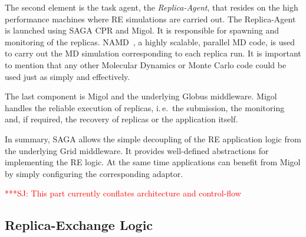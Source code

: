 \documentclass{rspublic}
\newcommand{\alnote}[1]{ {\textcolor{blue} { ***AL: #1 }}}
\newcommand{\jhanote}[1]{ {\textcolor{red} { ***SJ: #1 }}}
\newcommand{\alnote}[1]{}
\newcommand{\jhanote}[1]{}
\newcommand{\replicaagent}[1]{Replica-Agent }
\newcommand{\remanager}[1]{RE-Manager }
\begin{document}
The second element is the task agent, the \textit{Replica-Agent},
that resides on the high performance machines where RE simulations
are carried out. The \replicaagent\ is launched using SAGA CPR and Migol.
It is responsible for spawning and monitoring of the replicas. 
NAMD~\citep{Phillips:2005gd}, a highly scalable, parallel MD
code, is used to carry out the MD simulation corresponding to each
replica run. It is important to mention that any other Molecular Dynamics 
or Monte Carlo code could be used just as simply and effectively.

The last component is Migol and the underlying Globus middleware. 
Migol handles the reliable execution of replicas, i.\,e.\ the submission,
the monitoring and, if required, the recovery of replicas or the application itself. 

In summary, SAGA allows the simple decoupling of the RE application 
logic from the underlying Grid middleware. It provides well-defined
abstractions for implementing the RE logic. At the same
time applications can benefit from Migol by simply configuring the corresponding
adaptor.



                                  

\jhanote{This part currently conflates architecture and control-flow}
                       
\subsection{Replica-Exchange Logic}
                                            
\end{document}
